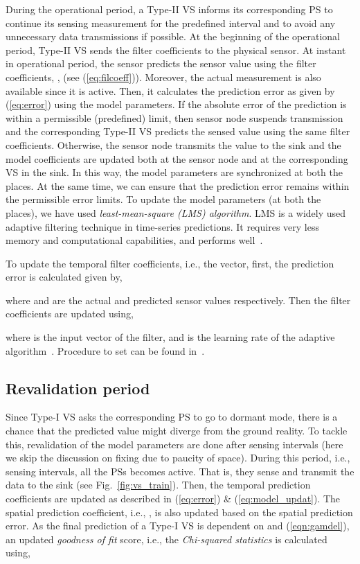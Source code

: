 \documentclass[a4paper,conference]{IEEEtran}
\begin{document}
During the operational period, a Type-II VS informs its corresponding PS to continue its sensing measurement for the predefined interval and to avoid any unnecessary data transmissions if possible. At the beginning of the operational period, Type-II VS sends the filter coefficients to the physical sensor. At  instant in operational period, the sensor predicts the sensor value using the filter coefficients, , (see (\ref{eq:filcoeff})). Moreover, the actual measurement is also available since it is active. Then, it calculates the prediction error as given by (\ref{eq:error}) using the model parameters. If the absolute error of the prediction is within a permissible (predefined) limit, then sensor node suspends transmission and the corresponding Type-II VS predicts the sensed value using the same filter coefficients. Otherwise, the sensor node transmits the value to the sink and the model coefficients are updated both at the sensor node and at the corresponding VS in the sink. In this way, the model parameters are synchronized at both the places. At the same time, we can ensure that the prediction error remains within the permissible error limits. To update the model parameters (at both the places), we have used {\it least-mean-square (LMS) algorithm}. LMS is a widely used adaptive filtering technique in time-series predictions. It requires very less memory and computational capabilities, and performs well~\cite{santini2006adaptive}.
 
To update the temporal filter coefficients, i.e., the  vector, first, the prediction error is calculated given by,

where  and  are the actual and predicted sensor values respectively. Then the filter coefficients are updated using,

where  is the input vector of the filter, and  is the learning rate of the adaptive algorithm~\cite{haykin2005adaptive}. Procedure to set  can be found in~\cite{santini2006adaptive}. 
\subsection{Revalidation period}
\label{sec:rvp}
Since Type-I VS asks the corresponding PS to go to dormant mode, there is a chance that the predicted value might diverge from the ground reality. To tackle this, revalidation of the model parameters are done after  sensing intervals (here we skip the discussion on fixing  due to paucity of space). During this period, i.e.,  sensing intervals, all the PSs becomes active. That is, they sense and transmit the data to the sink (see Fig.~\ref{fig:vs_train}). Then, the temporal prediction coefficients are updated as described in (\ref{eq:error}) \& (\ref{eq:model_updat}). The spatial prediction coefficient, i.e., , is also updated based on the spatial prediction error.
As the final prediction of a Type-I VS is dependent on  and  (\ref{eqn:gamdel}), an updated {\it goodness of fit} score, i.e., the {\it Chi-squared statistics} is calculated using,
\end{document}
